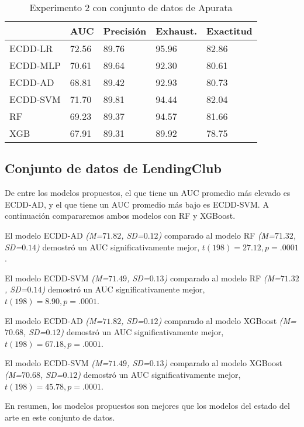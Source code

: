 \begin{table}[htbp]
\centering
\caption{Experimento 2 con conjunto de datos de Apurata}
\label{tab:apurata-proc2}
\begin{tabularx}{0.75\textwidth}{|l|Y Y Y Y|}
				\hline
				& AUC		& Precisión	& Exhaust.		& Exactitud	\\
				\hline
ECDD-LR			& 72.56		& 89.76		& 95.96			& 82.86		\\		%
ECDD-MLP	 	& 70.61		& 89.64		& 92.30			& 80.61		\\		%
ECDD-AD			& 68.81		& 89.42		& 92.93			& 80.73		\\		%
ECDD-SVM	 	& 71.70		& 89.81		& 94.44			& 82.04		\\		%
				\hline
RF		 		& 69.23		& 89.37		& 94.57			& 81.66		\\		%
XGB				& 67.91		& 89.31		& 89.92			& 78.75		\\		%
				\hline
\end{tabularx}
\end{table}

\subsection{Conjunto de datos de LendingClub}

De entre los modelos propuestos, el que tiene un \ac{AUC} promedio más elevado es ECDD-AD, y el que tiene un \ac{AUC} promedio más bajo es ECDD-SVM. A continuación compararemos ambos modelos con \ac{RF} y \ac{XGBoost}.

El modelo ECDD-AD \textit{(M=$71.82$, SD=$0.12$)} comparado al modelo \ac{RF} \textit{(M=$71.32$, SD=$0.14$)} demostró un \ac{AUC} significativamente mejor, $t(198)=27.12, p=.0001$.

El modelo ECDD-SVM  \textit{(M=$71.49$, SD=$0.13$)} comparado al modelo \ac{RF} \textit{(M=$71.32$, SD=$0.14$)} demostró un \ac{AUC} significativamente mejor, $t(198)=8.90, p=.0001$.

El modelo ECDD-AD \textit{(M=$71.82$, SD=$0.12$)} comparado al modelo \ac{XGBoost} \textit{(M=$70.68$, SD=$0.12$)} demostró un \ac{AUC} significativamente mejor, $t(198)=67.18, p=.0001$.

El modelo ECDD-SVM \textit{(M=$71.49$, SD=$0.13$)} comparado al modelo \ac{XGBoost} \textit{(M=$70.68$, SD=$0.12$)} demostró un \ac{AUC} significativamente mejor, $t(198)=45.78, p=.0001$.

En resumen, los modelos propuestos son mejores que los modelos del estado del arte en este conjunto de datos.

